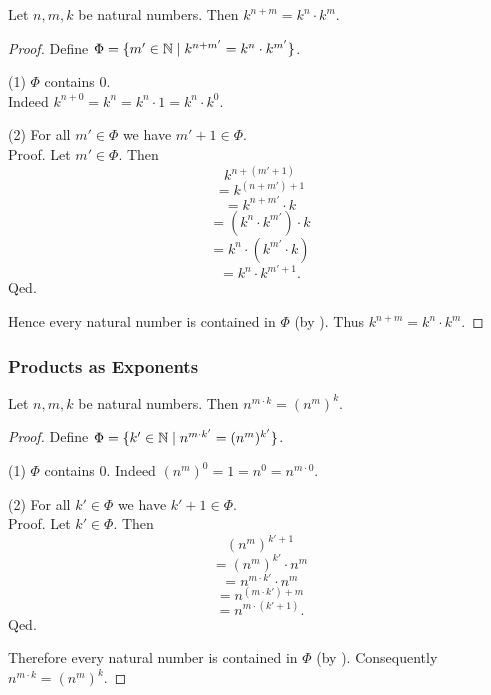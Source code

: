 \documentclass[10pt]{article}
\begin{document}
  \begin{forthel}
    \begin{proposition}[id=ARITHMETIC_09_8152207530655744,printid]
      Let $n, m, k$ be natural numbers.
      Then $k^{n + m} = k^{n} \cdot k^{m}$.
    \end{proposition}
    \begin{proof}
      Define $\Phi = \{ m' \in \mathbb{N} \mid k^{n + m'} = k^{n} \cdot k^{m'} \}$.

      (1) $\Phi$ contains $0$. \\
      Indeed $k^{n + 0}
        = k^{n}
        = k^{n} \cdot 1
        = k^{n} \cdot k^{0}$.

      (2) For all $m' \in \Phi$ we have $m' + 1 \in \Phi$. \\
      Proof.
        Let $m' \in \Phi$.
        Then
        \[  k^{n + (m' + 1)}                  \]
        \[    = k^{(n + m') + 1}              \]
        \[    = k^{n + m'} \cdot k            \]
        \[    = (k^{n} \cdot k^{m'}) \cdot k  \]
        \[    = k^{n} \cdot (k^{m'} \cdot k)  \]
        \[    = k^{n} \cdot k^{m' + 1}.       \]
      Qed.

      Hence every natural number is contained in $\Phi$ (by ).
      Thus $k^{n + m} = k^{n} \cdot k^{m}$.
    \end{proof}
  \end{forthel}


  \subsubsection*{Products as Exponents}

  \begin{forthel}
    \begin{proposition}[id=ARITHMETIC_09_7827956571308032,printid]
      Let $n, m, k$ be natural numbers.
      Then $n^{m \cdot k} = (n^{m})^{k}$.
    \end{proposition}
    \begin{proof}
      Define $\Phi = \{ k' \in \mathbb{N} \mid n^{m \cdot k'} = (n^{m})^{k'} \}$.

      (1) $\Phi$ contains $0$.
      Indeed $(n^{m})^{0}
        = 1
        = n^{0}
        = n^{m \cdot 0}$.

      (2) For all $k' \in \Phi$ we have $k' + 1 \in \Phi$. \\
      Proof.
        Let $k' \in \Phi$.
        Then
        \[  (n^{m})^{k' + 1}                \]
        \[    = (n^{m})^{k'} \cdot n^{m}    \]
        \[    = n^{m \cdot k'} \cdot n^{m}  \]
        \[    = n^{(m \cdot k') + m}        \]
        \[    = n^{m \cdot (k' + 1)}.       \]
      Qed.

      Therefore every natural number is contained in $\Phi$ (by ).
      Consequently $n^{m \cdot k} = (n^{m})^{k}$.
    \end{proof}
  \end{forthel}
\end{document}
